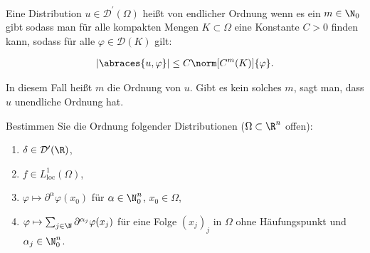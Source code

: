 
\begin{exercise}

Eine Distribution $u \in \mathcal{D}^\prime(\Omega)$ heißt von endlicher Ordnung wenn es ein $m \in \N_0$ gibt sodass man für alle kompakten Mengen $K \subset \Omega$ eine Konstante $C > 0$ finden kann, sodass für alle $\varphi \in \mathcal{D}(K)$ gilt:

\begin{align*}
    |\abraces{u, \varphi}|
    \leq
    C \norm[C^m(K)]{\varphi}.
\end{align*}

In diesem Fall heißt $m$ die Ordnung von $u$.
Gibt es kein solches $m$, sagt man, dass $u$ unendliche Ordnung hat.

Bestimmen Sie die Ordnung folgender Distributionen ($\Omega \subset \R^n$ offen):

\begin{enumerate}[label = (\roman*)]
    \item $\delta \in \mathcal{D}^\prime(\R)$,
    \item $f \in L^1_{\text{loc}}(\Omega)$,
    \item $\varphi \mapsto \partial^\alpha \varphi(x_0)$ für $\alpha \in \N_0^n$, $x_0 \in \Omega$,
    \item $\varphi \mapsto \sum_{j \in \N} \partial^{\alpha_j} \varphi(x_j)$ für eine Folge $(x_j)_j$ in $\Omega$ ohne Häufungspunkt und $\alpha_j \in \N_0^n$.
\end{enumerate}

\end{exercise}


